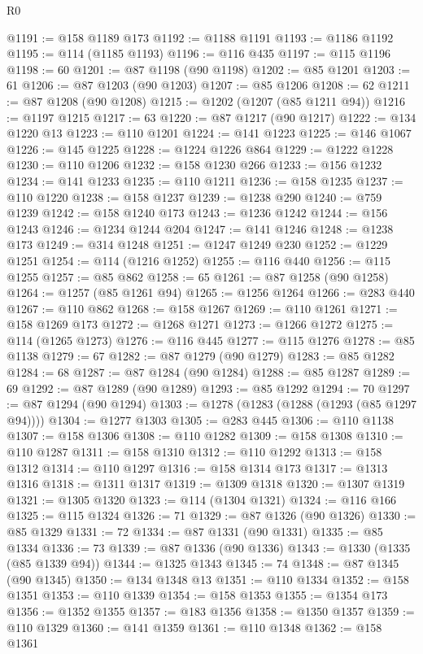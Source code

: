 \begin{lexlean}{R0}
\begin{coremodule}
@1191 := @158 @1189 @173
@1192 := @1188 @1191
@1193 := @1186 @1192
@1195 := @114 (@1185 @1193)
@1196 := @116 @435
@1197 := @115 @1196
@1198 := 60
@1201 := @87 @1198 (@90 @1198)
@1202 := @85 @1201
@1203 := 61
@1206 := @87 @1203 (@90 @1203)
@1207 := @85 @1206
@1208 := 62
@1211 := @87 @1208 (@90 @1208)
@1215 := @1202 (@1207 (@85 @1211 @94))
@1216 := @1197 @1215
@1217 := 63
@1220 := @87 @1217 (@90 @1217)
@1222 := @134 @1220 @13
@1223 := @110 @1201
@1224 := @141 @1223
@1225 := @146 @1067
@1226 := @145 @1225
@1228 := @1224 @1226 @864
@1229 := @1222 @1228
@1230 := @110 @1206
@1232 := @158 @1230 @266
@1233 := @156 @1232
@1234 := @141 @1233
@1235 := @110 @1211
@1236 := @158 @1235
@1237 := @110 @1220
@1238 := @158 @1237
@1239 := @1238 @290
@1240 := @759 @1239
@1242 := @158 @1240 @173
@1243 := @1236 @1242
@1244 := @156 @1243
@1246 := @1234 @1244 @204
@1247 := @141 @1246
@1248 := @1238 @173
@1249 := @314 @1248
@1251 := @1247 @1249 @230
@1252 := @1229 @1251
@1254 := @114 (@1216 @1252)
@1255 := @116 @440
@1256 := @115 @1255
@1257 := @85 @862
@1258 := 65
@1261 := @87 @1258 (@90 @1258)
@1264 := @1257 (@85 @1261 @94)
@1265 := @1256 @1264
@1266 := @283 @440
@1267 := @110 @862
@1268 := @158 @1267
@1269 := @110 @1261
@1271 := @158 @1269 @173
@1272 := @1268 @1271
@1273 := @1266 @1272
@1275 := @114 (@1265 @1273)
@1276 := @116 @445
@1277 := @115 @1276
@1278 := @85 @1138
@1279 := 67
@1282 := @87 @1279 (@90 @1279)
@1283 := @85 @1282
@1284 := 68
@1287 := @87 @1284 (@90 @1284)
@1288 := @85 @1287
@1289 := 69
@1292 := @87 @1289 (@90 @1289)
@1293 := @85 @1292
@1294 := 70
@1297 := @87 @1294 (@90 @1294)
@1303 := @1278 (@1283 (@1288 (@1293 (@85 @1297 @94))))
@1304 := @1277 @1303
@1305 := @283 @445
@1306 := @110 @1138
@1307 := @158 @1306
@1308 := @110 @1282
@1309 := @158 @1308
@1310 := @110 @1287
@1311 := @158 @1310
@1312 := @110 @1292
@1313 := @158 @1312
@1314 := @110 @1297
@1316 := @158 @1314 @173
@1317 := @1313 @1316
@1318 := @1311 @1317
@1319 := @1309 @1318
@1320 := @1307 @1319
@1321 := @1305 @1320
@1323 := @114 (@1304 @1321)
@1324 := @116 @166
@1325 := @115 @1324
@1326 := 71
@1329 := @87 @1326 (@90 @1326)
@1330 := @85 @1329
@1331 := 72
@1334 := @87 @1331 (@90 @1331)
@1335 := @85 @1334
@1336 := 73
@1339 := @87 @1336 (@90 @1336)
@1343 := @1330 (@1335 (@85 @1339 @94))
@1344 := @1325 @1343
@1345 := 74
@1348 := @87 @1345 (@90 @1345)
@1350 := @134 @1348 @13
@1351 := @110 @1334
@1352 := @158 @1351
@1353 := @110 @1339
@1354 := @158 @1353
@1355 := @1354 @173
@1356 := @1352 @1355
@1357 := @183 @1356
@1358 := @1350 @1357
@1359 := @110 @1329
@1360 := @141 @1359
@1361 := @110 @1348
@1362 := @158 @1361

\end{coremodule}
\end{lexlean}
